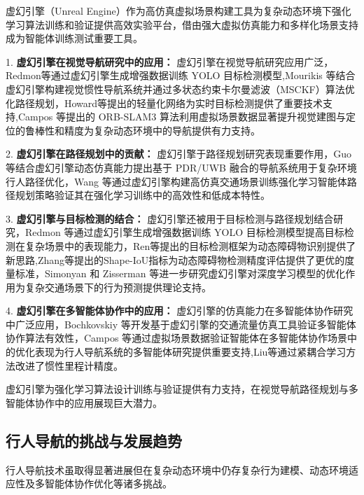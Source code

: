 虚幻引擎（Unreal Engine）作为高仿真虚拟场景构建工具为复杂动态环境下强化学习算法训练和验证提供高效实验平台，借由强大虚拟仿真能力和多样化场景支持成为智能体训练测试重要工具。

1. \textbf{虚幻引擎在视觉导航研究中的应用：} 虚幻引擎在视觉导航研究应用广泛，Redmon等\cite{redmon2017yolo9000}通过虚幻引擎生成增强数据训练 YOLO 目标检测模型,Mourikis 等\cite{mourikis2007msckf}结合虚幻引擎构建视觉惯性导航系统并通过多状态约束卡尔曼滤波（MSCKF）算法优化路径规划，Howard等\cite{howard2017mobilenets}提出的轻量化网络为实时目标检测提供了重要技术支持,Campos 等\cite{campos2021orbslam3}提出的 ORB-SLAM3 算法利用虚拟场景数据显著提升视觉建图与定位的鲁棒性和精度为复杂动态环境中的导航提供有力支持。

2. \textbf{虚幻引擎在路径规划中的贡献：} 虚幻引擎于路径规划研究表现重要作用，Guo 等\cite{guo2020pdr}结合虚幻引擎动态仿真能力提出基于 PDR/UWB 融合的导航系统用于复杂环境行人路径优化，Wang 等\cite{wang2023llio}通过虚幻引擎构建高仿真交通场景训练强化学习智能体路径规划策略验证其在强化学习训练中的高效性和低成本特性。

3. \textbf{虚幻引擎与目标检测的结合：} 虚幻引擎还被用于目标检测与路径规划结合研究，Redmon 等\cite{redmon2017yolo9000}通过虚幻引擎生成增强数据训练 YOLO 目标检测模型提高目标检测在复杂场景中的表现能力，Ren等\cite{ren2017fasterrcnn}提出的目标检测框架为动态障碍物识别提供了新思路,Zhang等\cite{zhang2023shapeiou}提出的Shape-IoU指标为动态障碍物检测精度评估提供了更优的度量标准，Simonyan 和 Zisserman 等\cite{simonyan2014action}进一步研究虚幻引擎对深度学习模型的优化作用为复杂交通场景下的行为预测提供理论支持。 

4. \textbf{虚幻引擎在多智能体协作中的应用：} 虚幻引擎的仿真能力在多智能体协作研究中广泛应用，Bochkovskiy 等\cite{bochkovskiy2020yolov4}开发基于虚幻引擎的交通流量仿真工具验证多智能体协作算法有效性，Campos 等\cite{campos2021orbslam3}通过虚拟场景数据验证智能体在多智能体协作场景中的优化表现为行人导航系统的多智能体研究提供重要支持,Liu等\cite{liu2020tlio}通过紧耦合学习方法改进了惯性里程计精度。

虚幻引擎为强化学习算法设计训练与验证提供有力支持，在视觉导航路径规划与多智能体协作中的应用展现巨大潜力。

\subsection{行人导航的挑战与发展趋势}

行人导航技术虽取得显著进展但在复杂动态环境中仍存复杂行为建模、动态环境适应性及多智能体协作优化等诸多挑战。

